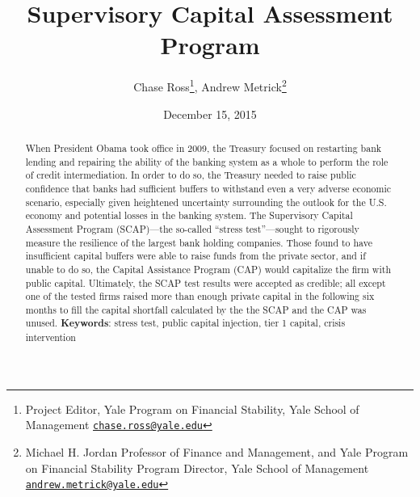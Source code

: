 \documentclass[12pt]{article}
\begin{document}
\lhead{ }

\renewcommand{\headrulewidth}{0.0pt}
\renewcommand{\footrulewidth}{0.0pt}


\title{Supervisory Capital Assessment Program}%
\author{Chase Ross\thanks{ Project Editor, Yale Program on Financial Stability, Yale School of Management \newline \texttt{\href{mailto:chase.ross@yale.edu}{chase.ross@yale.edu}}}, Andrew Metrick\thanks{Michael H. Jordan Professor of Finance and Management, and Yale Program on Financial Stability Program Director, Yale School of Management \newline \texttt{\href{mailto:andrew.metrick@yale.edu}{andrew.metrick@yale.edu}}}}
\date{December 15, 2015}



\maketitle

\begin{abstract}
When President Obama took office in 2009, the Treasury focused on
restarting bank lending and repairing the ability of the banking system
as a whole to perform the role of credit intermediation. In order to do
so, the Treasury needed to raise public confidence that banks had
sufficient buffers to withstand even a very adverse economic scenario,
especially given heightened uncertainty surrounding the outlook for the
U.S. economy and potential losses in the banking system. The Supervisory
Capital Assessment Program (SCAP)---the so-called ``stress
test''---sought to rigorously measure the resilience of the largest bank
holding companies. Those found to have insufficient capital buffers were
able to raise funds from the private sector, and if unable to do so, the
Capital Assistance Program (CAP) would capitalize the firm with public
capital. Ultimately, the SCAP test results were accepted as credible;
all except one of the tested firms raised more than enough private capital in
the following six months to fill the capital shortfall calculated by the
the SCAP and the CAP was unused.
\newline
\newline
\textbf{Keywords}: stress test, public capital injection, tier 1 capital, crisis intervention

\end{abstract}
\newpage
\tableofcontents
\newpage
\end{document}

